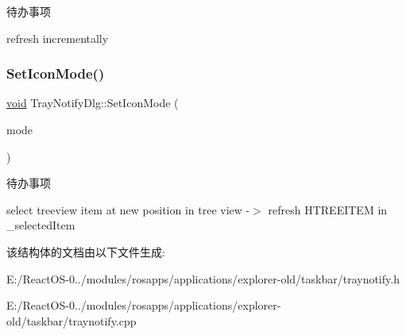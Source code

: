 \begin{DoxyRefDesc}{待办事项}
\item[\hyperlink{todo__todo000077}{待办事项}]refresh incrementally \end{DoxyRefDesc}
\mbox{\label{struct_tray_notify_dlg_a001841ee0119a56a1f009a3694109ea5}} 
\subsubsection{\texorpdfstring{Set\+Icon\+Mode()}{SetIconMode()}}
{\footnotesize\ttfamily \hyperlink{interfacevoid}{void} Tray\+Notify\+Dlg\+::\+Set\+Icon\+Mode (\begin{DoxyParamCaption}\item[{N\+O\+T\+I\+F\+Y\+I\+C\+O\+N\+M\+O\+DE}]{mode }\end{DoxyParamCaption})\hspace{0.3cm}{\ttfamily [protected]}}

\begin{DoxyRefDesc}{待办事项}
\item[\hyperlink{todo__todo000078}{待办事项}]select treeview item at new position in tree view -\/$>$ refresh H\+T\+R\+E\+E\+I\+T\+EM in \+\_\+selected\+Item \end{DoxyRefDesc}


该结构体的文档由以下文件生成\+:\begin{DoxyCompactItemize}
\item 
E\+:/\+React\+O\+S-\/0../modules/rosapps/applications/explorer-\/old/taskbar/traynotify.\+h\item 
E\+:/\+React\+O\+S-\/0../modules/rosapps/applications/explorer-\/old/taskbar/traynotify.\+cpp\end{DoxyCompactItemize}
